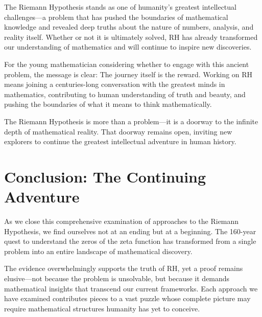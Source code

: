 \begin{final_thought}
The Riemann Hypothesis stands as one of humanity's greatest intellectual challenges—a problem that has pushed the boundaries of mathematical knowledge and revealed deep truths about the nature of numbers, analysis, and reality itself. Whether or not it is ultimately solved, RH has already transformed our understanding of mathematics and will continue to inspire new discoveries.

For the young mathematician considering whether to engage with this ancient problem, the message is clear: The journey itself is the reward. Working on RH means joining a centuries-long conversation with the greatest minds in mathematics, contributing to human understanding of truth and beauty, and pushing the boundaries of what it means to think mathematically.

The Riemann Hypothesis is more than a problem—it is a doorway to the infinite depth of mathematical reality. That doorway remains open, inviting new explorers to continue the greatest intellectual adventure in human history.
\end{final_thought}

\section{Conclusion: The Continuing Adventure}
\label{sec:conclusion}

As we close this comprehensive examination of approaches to the Riemann Hypothesis, we find ourselves not at an ending but at a beginning. The 160-year quest to understand the zeros of the zeta function has transformed from a single problem into an entire landscape of mathematical discovery.

The evidence overwhelmingly supports the truth of RH, yet a proof remains elusive—not because the problem is unsolvable, but because it demands mathematical insights that transcend our current frameworks. Each approach we have examined contributes pieces to a vast puzzle whose complete picture may require mathematical structures humanity has yet to conceive.

